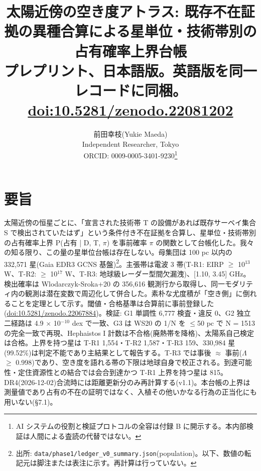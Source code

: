 \documentclass[11pt]{article}
\title{太陽近傍の空き度アトラス: 既存不在証拠の異種合算による星単位・技術帯別の占有確率上界台帳 \\[1ex] {\large プレプリント、日本語版。英語版を同一レコードに同梱。\url{doi:10.5281/zenodo.22081202}}}
\author{前田幸枝(Yukie Maeda) \\ Independent Researcher, Tokyo \\ ORCID: 0009-0005-3401-9230\thanks{AI システムの役割と検証プロトコルの全容は付録 B に開示する。本内部検証は人間による査読の代替ではない。}}
\date{}
\begin{document}
\maketitle

\section*{要旨}

\noindent 太陽近傍の恒星ごとに、「宣言された技術帯 T の設備があれば既存サーベイ集合 S で検出されていたはず」という条件付き不在証拠を合算し、星単位・技術帯別の占有確率上界 P(占有 | D, T, \(\pi\)) を事前確率 \(\pi\) の関数として台帳化した。我々の知る限り、この量の星単位台帳は存在しない。母集団は 100 pc 以内の 332,571 星(Gaia EDR3 GCNS 基盤)\footnote{出所: \texttt{data/phase1/ledger\_v0\_summary.json}(population)。以下、数値の転記元は脚注または表注に示す。再計算は行っていない。}。主張帯は電波 3 帯(T-R1: EIRP \(\geq\) 10\(^{13}\) W、T-R2: \(\geq\) 10\(^{17}\) W、T-R3: 地球級レーダー型間欠漏洩)、[1.10, 3.45] GHz。検出確率は Wlodarczyk-Sroka+20 の 356,616 観測行から取得し、同一モダリティ内の観測は潜在変数で周辺化して併合した。素朴な尤度積が「空き側」に倒れることを定理として示す。閾値・合格基準は合算前に事前登録した(\url{doi:10.5281/zenodo.22067884})。検証: G1 単調性 6,777 検査・違反 0、G2 独立二経路は 4.9 \(\times\) 10\(^{-10}\) dex で一致、G3 は WS20 の 1/N を \(\leq\)50 pc で N = 1513 の完全一致で再現、Hephaistos I 計数は不合格(廃熱帯を降格)、太陽系自己検定は合格。上界を持つ星は T-R1 1,554・T-R2 1,587・T-R3 159、330,984 星(99.52\%)は判定不能であり主結果として報告する。T-R3 では事後 \(\approx\) 事前(\(\Lambda\) \(\geq\) 0.998)であり、空き度を語れる帯の下限は地球自身で校正される。到達可能性・定住資源性との結合では会合到達かつ T-R1 上界を持つ星は 815。DR4(2026-12-02)合流時には距離更新分のみ再計算する(v1.1)。本台帳の上界は測量値であり占有の不在の証明ではなく、入植その他いかなる行為の正当化にも用いない(\S{}7.1)。\par\smallskip
\end{document}
